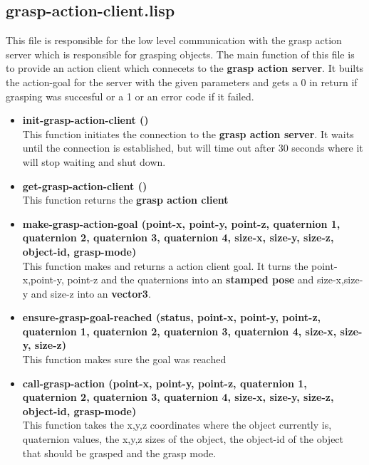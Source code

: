 \documentclass[main.tex]{subfiles}
\begin{document}
		\subsection{grasp-action-client.lisp}
		This file is responsible for the low level communication with the
		grasp action server which is responsible for grasping objects. The main function of this file is to provide an action client which connecets to the \textbf{grasp action server}. It builts the action-goal for the server with the given parameters and gets a 0 in return if grasping was succesful or a 1  or an error code if it failed.
		\begin{itemize}
			\item \textbf{init-grasp-action-client ()} \\
			This function initiates the connection to the \textbf{grasp action server}. It waits until the connection is established, but will time out after 30 seconds where it will stop waiting and shut down. 
			\item \textbf{get-grasp-action-client ()} \\
			This function returns the \textbf{grasp action client}
			\item \textbf{make-grasp-action-goal (point-x, point-y, point-z, quaternion 1, quaternion 2, quaternion 3, quaternion 4, size-x, size-y, size-z, object-id, grasp-mode)} \\
			This function makes and returns a action client goal. It turns the point-x,point-y, point-z and the quaternions into an \textbf{stamped pose} and size-x,size-y and size-z into an \textbf{vector3}.
			\item \textbf{ensure-grasp-goal-reached (status, point-x, point-y, point-z, quaternion 1, quaternion 2, quaternion 3, quaternion 4, size-x, size-y, size-z)} \\
            This function makes sure the goal was reached
			\item \textbf{call-grasp-action (point-x, point-y, point-z, quaternion 1, quaternion 2, quaternion 3, quaternion 4, size-x, size-y, size-z, object-id, grasp-mode)} \\
			This function takes the x,y,z coordinates where the object currently is, quaternion values, the x,y,z sizes of the object, the object-id of the object that should be grasped and the grasp mode.
		\end{itemize}
\end{document}
